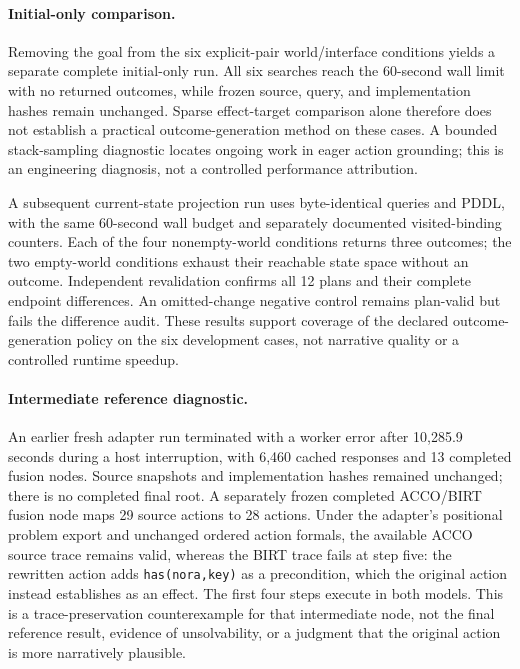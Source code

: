 \documentclass[letterpaper]{article}
\begin{document}
\paragraph{Initial-only comparison.}
Removing the goal from the six explicit-pair world/interface conditions yields a separate complete initial-only run. All six searches reach the 60-second wall limit with no returned outcomes, while frozen source, query, and implementation hashes remain unchanged. Sparse effect-target comparison alone therefore does not establish a practical outcome-generation method on these cases. A bounded stack-sampling diagnostic locates ongoing work in eager action grounding; this is an engineering diagnosis, not a controlled performance attribution.

A subsequent current-state projection run uses byte-identical queries and PDDL, with the same 60-second wall budget and separately documented visited-binding counters. Each of the four nonempty-world conditions returns three outcomes; the two empty-world conditions exhaust their reachable state space without an outcome. Independent revalidation confirms all 12 plans and their complete endpoint differences. An omitted-change negative control remains plan-valid but fails the difference audit. These results support coverage of the declared outcome-generation policy on the six development cases, not narrative quality or a controlled runtime speedup.

\paragraph{Intermediate reference diagnostic.}
An earlier fresh adapter run terminated with a worker error after 10,285.9 seconds during a host interruption, with 6,460 cached responses and 13 completed fusion nodes. Source snapshots and implementation hashes remained unchanged; there is no completed final root. A separately frozen completed ACCO/BIRT fusion node maps 29 source actions to 28 actions. Under the adapter's positional problem export and unchanged ordered action formals, the available ACCO source trace remains valid, whereas the BIRT trace fails at step five: the rewritten action adds \texttt{has(nora,key)} as a precondition, which the original action instead establishes as an effect. The first four steps execute in both models. This is a trace-preservation counterexample for that intermediate node, not the final reference result, evidence of unsolvability, or a judgment that the original action is more narratively plausible.
\end{document}
